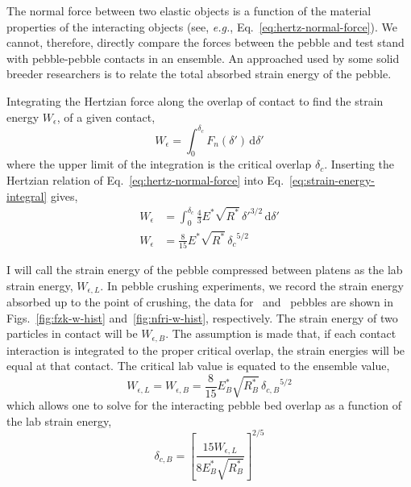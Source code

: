 The normal force between two elastic objects is a function of the material properties of the interacting objects (see, \textit{e.g.}, Eq.~\ref{eq:hertz-normal-force}). We cannot, therefore, directly compare the forces between the pebble and test stand with pebble-pebble contacts in an ensemble. An approached used by some solid breeder researchers is to relate the total absorbed strain energy of the pebble.\cite{Zhao2013,Annabattula2012a}

Integrating the Hertzian force along the overlap of contact to find the strain energy $W_\epsilon$, of a given contact,
\begin{equation}\label{eq:strain-energy-integral}
	W_\epsilon = \int_0^{\delta_c}\!F_n(\delta')\,\mathrm{d}\delta'
\end{equation}
where the upper limit of the integration is the critical overlap $\delta_c$. Inserting the Hertzian relation of Eq.~\ref{eq:hertz-normal-force} into Eq.~\ref{eq:strain-energy-integral} gives,
\begin{align}
	W_\epsilon& = \int_0^{\delta_c}\!  \frac{4}{3}E^*\sqrt{R^*}\,\delta'^{3/2} \,\mathrm{d}\delta' \\
	W_\epsilon & = \frac{8}{15}E^*\sqrt{R^*}\, {\delta_c}^{5/2}
\end{align}

I will call the strain energy of the pebble compressed between platens as the lab strain energy, $W_{\epsilon,L}$. In pebble crushing experiments, we record the strain energy absorbed up to the point of crushing, the data for \lis~and \lit~pebbles are shown in Figs.~\ref{fig:fzk-w-hist} and~\ref{fig:nfri-w-hist}, respectively. The strain energy of two particles in contact will be $W_{\epsilon,B}$. The assumption is made that, if each contact interaction is integrated to the proper critical overlap, the strain energies will be equal at that contact. The critical lab value is equated to the ensemble value,
\begin{equation}
	W_{\epsilon,L} = W_{\epsilon,B} = \frac{8}{15}E_B^*\sqrt{R_B^*}\, {\delta_{c,B}}^{5/2}
\end{equation}
which allows one to solve for the interacting pebble bed overlap as a function of the lab strain energy,
\begin{equation}
	\delta_{c,B} = \left[\frac{15W_{\epsilon,L}}{8E_B^*\sqrt{R_B^*}}\right]^{2/5}
\end{equation}

